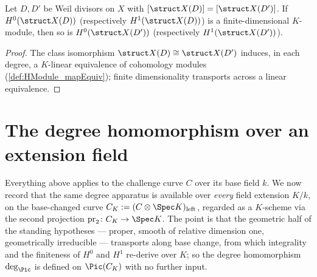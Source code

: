 \begin{theorem}
  \label{thm:moduleFinite_hModule_divisorSheaf_class}
  \leanok
  Let \(D, D'\) be Weil divisors on \(X\) with \([\struct X(D)] = [\struct X(D')]\). If
  \(H^0(\struct X(D))\) (respectively \(H^1(\struct X(D))\)) is a finite-dimensional
  \(K\)-module, then so is \(H^0(\struct X(D'))\) (respectively \(H^1(\struct X(D'))\)).
\end{theorem}
\begin{proof}
  \leanok
  The class isomorphism \(\struct X(D) \cong \struct X(D')\) induces, in each degree, a
  \(K\)-linear equivalence of cohomology modules (\ref{def:HModule_mapEquiv}); finite
  dimensionality transports across a linear equivalence.
\end{proof}

\section{The degree homomorphism over an extension field}

Everything above applies to the challenge curve \(C\) over its base field \(k\). We now record
that the same degree apparatus is available over \emph{every} field extension \(K/k\), on the
base-changed curve \(C_K := (C \otimes \Spec K)_{\mathrm{left}}\), regarded as a \(K\)-scheme via
the second projection \(\mathrm{pr}_2 \colon C_K \to \Spec K\). The point is that the geometric
half of the standing hypotheses --- proper, smooth of relative dimension one, geometrically
irreducible --- transports along base change, from which integrality and the finiteness of
\(H^0\) and \(H^1\) re-derive over \(K\); so the degree homomorphism \(\deg_{\Pic}\) is defined on
\(\Pic(C_K)\) with no further input.

